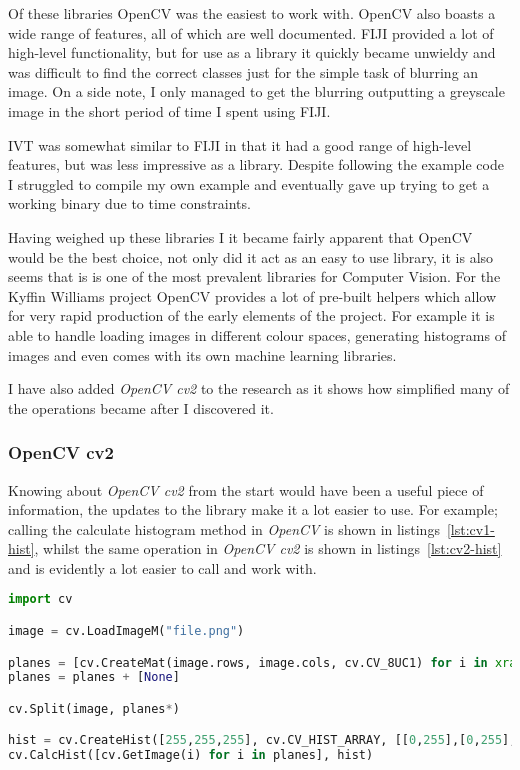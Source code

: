 Of these libraries OpenCV was the easiest to work with. OpenCV also boasts a wide range of 
features, all of which are well documented. FIJI provided a lot of high-level functionality, but
for use as a library it quickly became unwieldy and was difficult to find the correct classes just 
for the simple task of blurring an image. On a side note, I only managed to get the blurring 
outputting a greyscale image in the short period of time I spent using FIJI.

IVT was somewhat similar to FIJI in that it had a good range of high-level features, but was less
impressive as a library. Despite following the example code I struggled to compile my own example
and eventually gave up trying to get a working binary due to time constraints.


Having weighed up these libraries I it became fairly apparent that OpenCV would be the best choice,
not only did it act as an easy to use library, it is also seems that is is one of the most 
prevalent libraries for Computer Vision. For the Kyffin Williams project OpenCV provides a lot of
pre-built helpers which allow for very rapid production of the early elements of the project. For
example it is able to handle loading images in different colour spaces, generating histograms of
images and even comes with its own machine learning libraries.

I have also added \emph{OpenCV cv2} to the research as it shows how simplified many of the 
operations became after I discovered it.

\subsubsection{OpenCV cv2}
Knowing about \emph{OpenCV cv2} from the start would have been a useful piece of information, the
updates to the library make it a lot easier to use. For example; calling the calculate histogram
method in \emph{OpenCV} is shown in listings~\ref{lst:cv1-hist}, whilst the same operation in 
\emph{OpenCV cv2} is shown in listings~\ref{lst:cv2-hist} and is evidently a lot easier to call
and work with.

\begin{lstlisting}[language=python, caption={Creating a Histogram in OpenCV}, label=lst:cv1-hist, 
breaklines=true, frame=single]
import cv

image = cv.LoadImageM("file.png")

planes = [cv.CreateMat(image.rows, image.cols, cv.CV_8UC1) for i in xrange(3)]
planes = planes + [None]

cv.Split(image, planes*)

hist = cv.CreateHist([255,255,255], cv.CV_HIST_ARRAY, [[0,255],[0,255],[0,255]], 1)
cv.CalcHist([cv.GetImage(i) for i in planes], hist)
\end{lstlisting}



